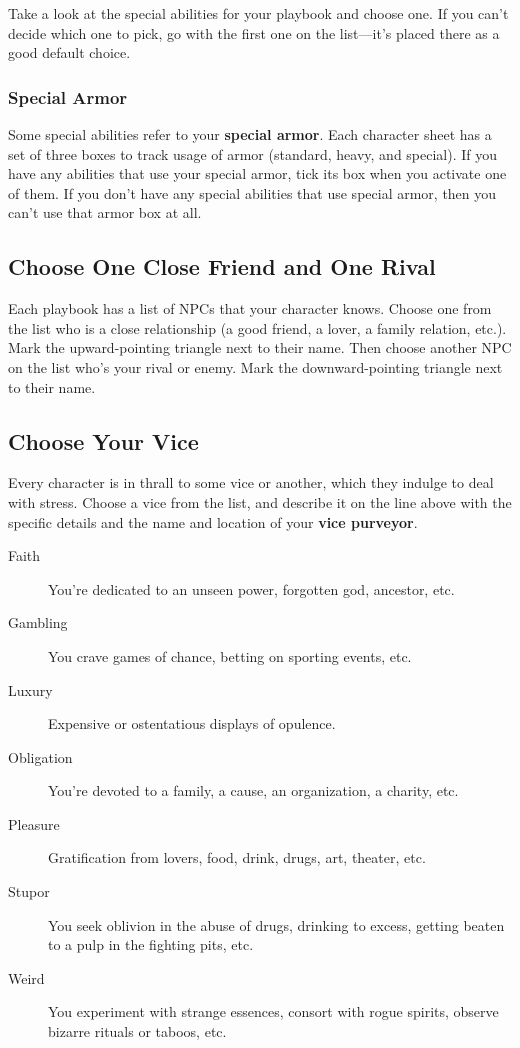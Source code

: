 Take a look at the special abilities for your playbook and choose one. If you can’t decide which one to pick, go with the first one on the list—it’s placed there as a good default choice.

\subsubsection{Special Armor}

Some special abilities refer to your \textbf{special armor}. Each character sheet has a set of three boxes to track usage of armor (standard, heavy, and special). If you have any abilities that use your special armor, tick its box when you activate one of them. If you don’t have any special abilities that use special armor, then you can’t use that armor box at all.

\subsection{Choose One Close Friend and One Rival}

Each playbook has a list of NPCs that your character knows. Choose one from the list who is a close relationship (a good friend, a lover, a family relation, etc.). Mark the upward-pointing triangle next to their name. Then choose another NPC on the list who’s your rival or enemy. Mark the downward-pointing triangle next to their name.

\subsection{Choose Your Vice}

Every character is in thrall to some vice or another, which they indulge to deal with stress. Choose a vice from the list, and describe it on the line above with the specific details and the name and location of your \textbf{vice purveyor}.

\begin{description}
\item[Faith] You’re dedicated to an unseen power, forgotten god, ancestor, etc.
\item[Gambling] You crave games of chance, betting on sporting events, etc.
\item[Luxury] Expensive or ostentatious displays of opulence.
\item[Obligation] You’re devoted to a family, a cause, an organization, a charity, etc.
\item[Pleasure] Gratification from lovers, food, drink, drugs, art, theater, etc.
\item[Stupor] You seek oblivion in the abuse of drugs, drinking to excess, getting beaten to a pulp in the fighting pits, etc.
\item[Weird] You experiment with strange essences, consort with rogue spirits, observe bizarre rituals or taboos, etc.
\end{description}


